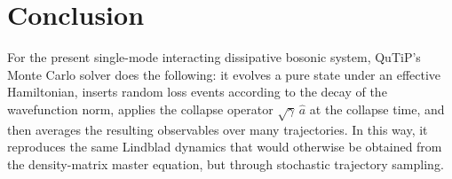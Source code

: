 \documentclass[12pt]{article}
\begin{document}
\section*{Conclusion}
For the present single-mode interacting dissipative bosonic system, QuTiP's Monte Carlo solver does the following: it evolves a pure state under an effective Hamiltonian, inserts random loss events according to the decay of the wavefunction norm, applies the collapse operator $\sqrt{\gamma}\,\hat a$ at the collapse time, and then averages the resulting observables over many trajectories. In this way, it reproduces the same Lindblad dynamics that would otherwise be obtained from the density-matrix master equation, but through stochastic trajectory sampling.
\end{document}
